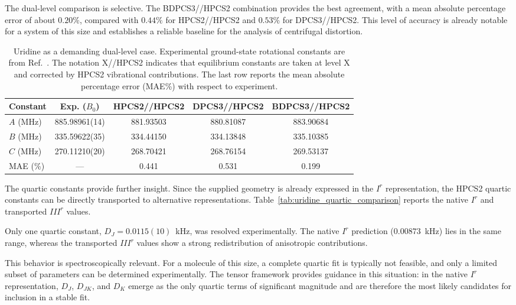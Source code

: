 \documentclass[aip,jcp,reprint,floatfix]{revtex4-2}
\begin{document}
The dual-level comparison is selective. The BDPCS3//HPCS2 combination
provides the best agreement, with a mean absolute percentage error of
about $0.20\%$, compared with $0.44\%$ for HPCS2//HPCS2 and $0.53\%$
for DPCS3//HPCS2. This level of accuracy is already notable for a
system of this size and establishes a reliable baseline for the
analysis of centrifugal distortion.

\begin{table}[t]
\centering
\scriptsize
\caption{Uridine as a demanding dual-level case. Experimental
ground-state rotational constants are from
Ref.~. The notation X//HPCS2 indicates that
equilibrium constants are taken at level X and corrected by HPCS2
vibrational contributions. The last row reports the mean absolute
percentage error (MAE\%) with respect to experiment.}

\begin{tabular}{lcccc}
\hline
Constant & Exp. ($B_0$) & HPCS2//HPCS2 & DPCS3//HPCS2 & BDPCS3//HPCS2 \\
\hline
$A$ (MHz) & 885.98961(14) & 881.93503 & 880.81087 & 883.90684 \\
$B$ (MHz) & 335.59622(35) & 334.44150 & 334.13848 & 335.10385 \\
$C$ (MHz) & 270.11210(20) & 268.70421 & 268.76154 & 269.53137 \\
\hline
MAE (\%) & --- & 0.441 & 0.531 & 0.199 \\
\hline
\end{tabular}
\label{tab:uridine_rotational_duallevel}
\end{table}

The quartic constants provide further insight. Since the supplied
geometry is already expressed in the $I^r$ representation, the HPCS2
quartic constants can be directly transported to alternative
representations. Table~\ref{tab:uridine_quartic_comparison} reports
the native $I^r$ and transported $III^r$ values.

Only one quartic constant, $D_J = 0.0115(10)$~kHz, was resolved
experimentally. The native $I^r$ prediction ($0.00873$~kHz) lies in
the same range, whereas the transported $III^r$ values show a strong
redistribution of anisotropic contributions.

This behavior is spectroscopically relevant. For a molecule of this
size, a complete quartic fit is typically not feasible, and only a
limited subset of parameters can be determined experimentally. The
tensor framework provides guidance in this situation: in the native
$I^r$ representation, $D_J$, $D_{JK}$, and $D_K$ emerge as the only
quartic terms of significant magnitude and are therefore the most
likely candidates for inclusion in a stable fit.
\end{document}

